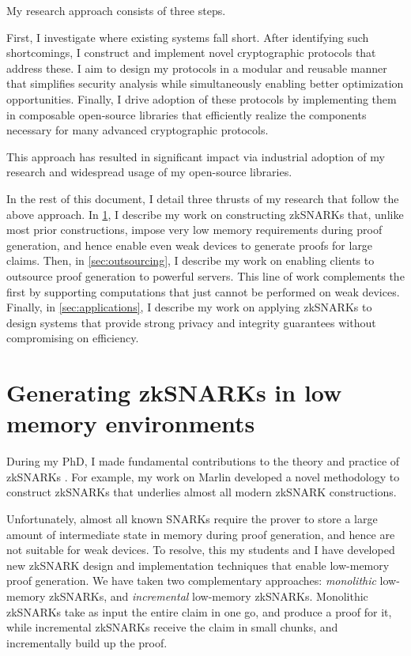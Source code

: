 \documentclass[11pt,letterpaper]{article}
\theoremstyle{definition} %
\theoremstyle{remark} %
\begin{document}
My research approach consists of three steps. 

First, I investigate where existing systems fall short.
After identifying such shortcomings, I construct and implement novel cryptographic protocols that address these. I aim to design my protocols in a modular and reusable manner that simplifies security analysis while simultaneously enabling better optimization opportunities.
Finally, I drive adoption of these protocols by implementing them in composable open-source libraries that efficiently realize the components necessary for many advanced cryptographic protocols.

This approach has resulted in significant impact via industrial adoption of my research and widespread usage of my open-source libraries.

In the rest of this document, I detail three thrusts of my research that follow the above approach.
In \cref{sec:low-memory-proving}, I describe my work on constructing zkSNARKs that, unlike most prior constructions, impose very low memory requirements during proof generation, and hence enable even weak devices to generate proofs for large claims.
Then, in \cref{sec:outsourcing}, I describe my work on enabling clients to outsource proof generation to powerful servers. This line of work complements the first by supporting computations that just cannot be performed on weak devices.
Finally, in \cref{sec:applications}, I describe my work on applying zkSNARKs to design systems that provide strong privacy and integrity guarantees without compromising on efficiency.

\section{Generating zkSNARKs in low memory environments}
\label{sec:low-memory-proving}

During my PhD, I made fundamental contributions to the theory and practice of zkSNARKs \cite{ChiesaHMMVW20, BunzCMS20, BunzCLMS21, BunzMMTV21}.
For example, my work on Marlin \cite{ChiesaHMMVW20} developed a novel methodology to construct zkSNARKs that underlies almost all modern zkSNARK constructions.

Unfortunately, almost all known SNARKs require the prover to store a large amount of intermediate state in memory during proof generation, and hence are not suitable for weak devices.
To resolve, this my students and I have developed new zkSNARK design and implementation techniques that enable low-memory proof generation.
We have taken two complementary approaches: \emph{monolithic} low-memory zkSNARKs, and \emph{incremental} low-memory zkSNARKs.
Monolithic zkSNARKs take as input the entire claim in one go, and produce a proof for it, while incremental zkSNARKs receive the claim in small chunks, and incrementally build up the proof.
\end{document}
